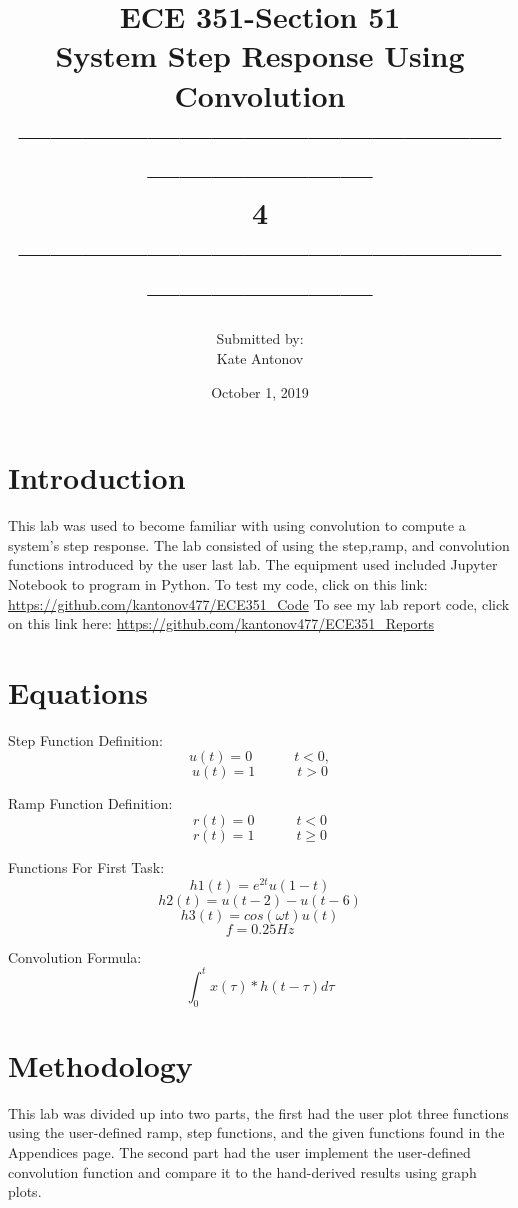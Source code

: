 \documentclass[12pt]{article}
\title{ECE 351-Section 51 \\ System Step Response Using Convolution \\ ------------------------------------------------------------------\\ 4 \\------------------------------------------------------------------}
\author{Submitted by: \\  Kate Antonov}
\date{October 1, 2019}
\begin{document}
\vspace{\fill}

\maketitle

\vspace{\fill}
\thispagestyle{empty}
\clearpage

\clearpage
\thispagestyle{empty}
\tableofcontents
\clearpage

\section{Introduction}
This lab was used to become familiar with using convolution to compute a system's step response. The lab consisted of using the step,ramp, and convolution functions introduced by the user last lab. The equipment used included Jupyter Notebook to program in Python. To test my code, click on this link: 
\url{https://github.com/kantonov477/ECE351_Code}
\newline
To see my lab report code, click on this link here: 
\url{https://github.com/kantonov477/ECE351_Reports}
\section{Equations}
Step Function Definition:
\[u(t) = 0  \hspace{3em} t < 0,\]
\[u(t) = 1  \hspace{3em} t > 0\]

Ramp Function Definition:
\[r(t) = 0 \hspace{3em} t < 0\]
\[r(t) = 1 \hspace{3em} t 	\geq 0\]

Functions For First Task:
\[h1(t)= e^{2t} u(1 − t)\]
\[h2(t)= u(t − 2) − u(t − 6)\]
\[h3(t)= cos(\omega t) u(t)\] 
\[f = 0.25Hz\]

Convolution Formula:
\[\int_{0}^{t} x(\tau)*h(t-\tau) d\tau\]

\section{ Methodology}
This lab was divided up into two parts, the first had the user plot three functions using the user-defined ramp, step functions, and the given functions found in the Appendices page. The second part had the user implement the user-defined convolution function and compare it to the hand-derived results using graph plots.
\end{document}
